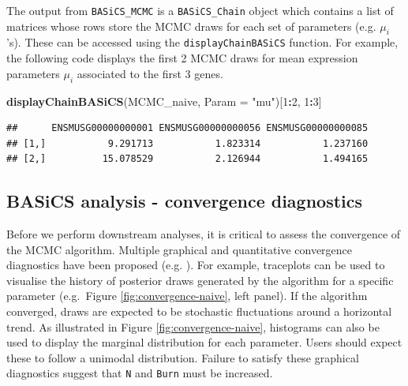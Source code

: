\documentclass[9pt,a4paper,]{extarticle}
\newenvironment{Shaded}{\begin{snugshade}}{\end{snugshade}}
\newcommand{\DataTypeTok}[1]{\textcolor[rgb]{0.13,0.29,0.53}{#1}}
\newcommand{\DecValTok}[1]{\textcolor[rgb]{0.00,0.00,0.81}{#1}}
\newcommand{\KeywordTok}[1]{\textcolor[rgb]{0.13,0.29,0.53}{\textbf{#1}}}
\newcommand{\NormalTok}[1]{#1}
\newcommand{\OperatorTok}[1]{\textcolor[rgb]{0.81,0.36,0.00}{\textbf{#1}}}
\newcommand{\StringTok}[1]{\textcolor[rgb]{0.31,0.60,0.02}{#1}}
\begin{document}
The output from \texttt{BASiCS\_MCMC} is a \texttt{BASiCS\_Chain} object which contains a list
of matrices whose rows store the MCMC draws for each set of parameters
(e.g. \(\mu_i\)'s).
These can be accessed using the \texttt{displayChainBASiCS} function.
For example, the following code displays the first 2 MCMC draws for mean
expression parameters \(\mu_i\) associated to the first 3 genes.

\begin{Shaded}
\begin{Highlighting}[]
\KeywordTok{displayChainBASiCS}\NormalTok{(MCMC_naive, }\DataTypeTok{Param =} \StringTok{"mu"}\NormalTok{)[}\DecValTok{1}\OperatorTok{:}\DecValTok{2}\NormalTok{, }\DecValTok{1}\OperatorTok{:}\DecValTok{3}\NormalTok{]}
\end{Highlighting}
\end{Shaded}

\begin{verbatim}
##      ENSMUSG00000000001 ENSMUSG00000000056 ENSMUSG00000000085
## [1,]           9.291713           1.823314           1.237160
## [2,]          15.078529           2.126944           1.494165
\end{verbatim}

\hypertarget{basics-analysis---convergence-diagnostics}{%
\subsection{BASiCS analysis - convergence diagnostics}\label{basics-analysis---convergence-diagnostics}}

Before we perform downstream analyses, it is critical to assess the convergence
of the MCMC algorithm.
Multiple graphical and quantitative convergence diagnostics have been proposed
(e.g. \citep{CowlesCarlin1996, BrooksGelman1998}).
For example, traceplots can be used to visualise the history of posterior draws
generated by the algorithm for a specific parameter (e.g.~Figure
\ref{fig:convergence-naive}, left panel).
If the algorithm converged, draws are expected to be stochastic fluctuations
around a horizontal trend.
As illustrated in Figure \ref{fig:convergence-naive}, histograms can also be
used to display the marginal distribution for each parameter.
Users should expect these to follow a unimodal distribution.
Failure to satisfy these graphical diagnostics suggest that \texttt{N} and \texttt{Burn} must
be increased.
\end{document}
